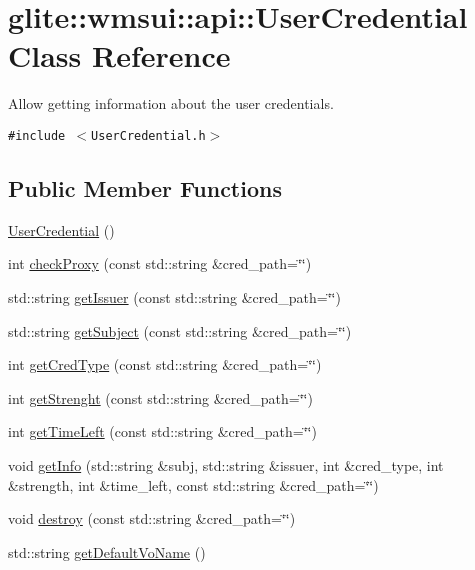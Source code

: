 \hypertarget{classglite_1_1wmsui_1_1api_1_1UserCredential}{
\section{glite::wmsui::api::User\-Credential Class Reference}
\label{classglite_1_1wmsui_1_1api_1_1UserCredential}
}
Allow getting information about the user credentials.  


{\tt \#include $<$User\-Credential.h$>$}

\subsection*{Public Member Functions}
\begin{CompactItemize}
\item 
\hyperlink{classglite_1_1wmsui_1_1api_1_1UserCredential_a0}{User\-Credential} ()
\item 
int \hyperlink{classglite_1_1wmsui_1_1api_1_1UserCredential_a1}{check\-Proxy} (const std::string \&cred\_\-path=\char`\"{}\char`\"{})
\item 
std::string \hyperlink{classglite_1_1wmsui_1_1api_1_1UserCredential_a2}{get\-Issuer} (const std::string \&cred\_\-path=\char`\"{}\char`\"{})
\item 
std::string \hyperlink{classglite_1_1wmsui_1_1api_1_1UserCredential_a3}{get\-Subject} (const std::string \&cred\_\-path=\char`\"{}\char`\"{})
\item 
int \hyperlink{classglite_1_1wmsui_1_1api_1_1UserCredential_a4}{get\-Cred\-Type} (const std::string \&cred\_\-path=\char`\"{}\char`\"{})
\item 
int \hyperlink{classglite_1_1wmsui_1_1api_1_1UserCredential_a5}{get\-Strenght} (const std::string \&cred\_\-path=\char`\"{}\char`\"{})
\item 
int \hyperlink{classglite_1_1wmsui_1_1api_1_1UserCredential_a6}{get\-Time\-Left} (const std::string \&cred\_\-path=\char`\"{}\char`\"{})
\item 
void \hyperlink{classglite_1_1wmsui_1_1api_1_1UserCredential_a7}{get\-Info} (std::string \&subj, std::string \&issuer, int \&cred\_\-type, int \&strength, int \&time\_\-left, const std::string \&cred\_\-path=\char`\"{}\char`\"{})
\item 
void \hyperlink{classglite_1_1wmsui_1_1api_1_1UserCredential_a8}{destroy} (const std::string \&cred\_\-path=\char`\"{}\char`\"{})
\item 
std::string \hyperlink{classglite_1_1wmsui_1_1api_1_1UserCredential_a9}{get\-Default\-Vo\-Name} ()

\end{CompactItemize}
